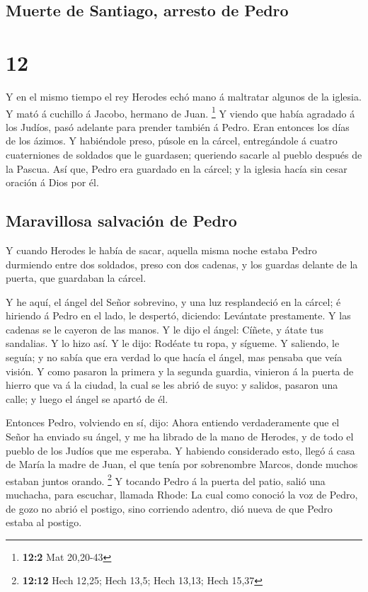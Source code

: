\hypertarget{muerte-de-santiago-arresto-de-pedro}{%
\subsection{Muerte de Santiago, arresto de
Pedro}\label{muerte-de-santiago-arresto-de-pedro}}

\hypertarget{section-11}{%
\section{12}\label{section-11}}

 Y en el mismo tiempo el rey Herodes echó mano á maltratar
algunos de la iglesia.  Y mató á cuchillo á Jacobo, hermano
de Juan. \footnote{\textbf{12:2} Mat 20,20-43}  Y viendo que
había agradado á los Judíos, pasó adelante para prender también á Pedro.
Eran entonces los días de los ázimos.  Y habiéndole preso,
púsole en la cárcel, entregándole á cuatro cuaterniones de soldados que
le guardasen; queriendo sacarle al pueblo después de la Pascua.
 Así que, Pedro era guardado en la cárcel; y la iglesia
hacía sin cesar oración á Dios por él.

\hypertarget{maravillosa-salvaciuxf3n-de-pedro}{%
\subsection{Maravillosa salvación de
Pedro}\label{maravillosa-salvaciuxf3n-de-pedro}}

 Y cuando Herodes le había de sacar, aquella misma noche
estaba Pedro durmiendo entre dos soldados, preso con dos cadenas, y los
guardas delante de la puerta, que guardaban la cárcel.

 Y he aquí, el ángel del Señor sobrevino, y una luz
resplandeció en la cárcel; é hiriendo á Pedro en el lado, le despertó,
diciendo: Levántate prestamente. Y las cadenas se le cayeron de las
manos.  Y le dijo el ángel: Cíñete, y átate tus sandalias. Y
lo hizo así. Y le dijo: Rodéate tu ropa, y sígueme.  Y
saliendo, le seguía; y no sabía que era verdad lo que hacía el ángel,
mas pensaba que veía visión.  Y como pasaron la primera y
la segunda guardia, vinieron á la puerta de hierro que va á la ciudad,
la cual se les abrió de suyo: y salidos, pasaron una calle; y luego el
ángel se apartó de él.

 Entonces Pedro, volviendo en sí, dijo: Ahora entiendo
verdaderamente que el Señor ha enviado su ángel, y me ha librado de la
mano de Herodes, y de todo el pueblo de los Judíos que me esperaba.
 Y habiendo considerado esto, llegó á casa de María la
madre de Juan, el que tenía por sobrenombre Marcos, donde muchos estaban
juntos orando. \footnote{\textbf{12:12} Hech 12,25; Hech 13,5; Hech
  13,13; Hech 15,37}  Y tocando Pedro á la puerta del
patio, salió una muchacha, para escuchar, llamada Rhode: 
La cual como conoció la voz de Pedro, de gozo no abrió el postigo, sino
corriendo adentro, dió nueva de que Pedro estaba al postigo.


